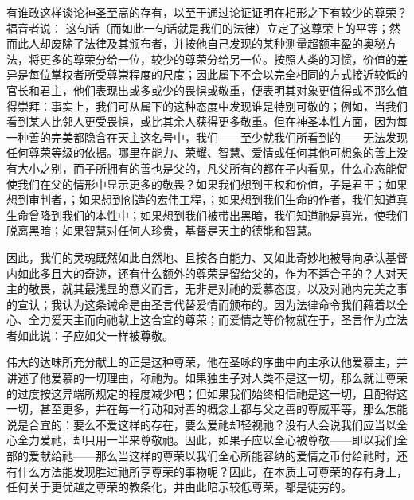 有谁敢这样谈论神圣至高的存有，以至于通过论证证明在相形之下有较少的尊荣？福音者说： 这句话（而如此一句话就是我们的法律）立定了这尊荣上的平等；然而此人却废除了法律及其颁布者，并按他自己发现的某种测量超额丰盈的奥秘方法，将更多的尊荣分给一位，较少的尊荣分给另一位。按照人类的习惯，价值的差异是每位掌权者所受尊崇程度的尺度；因此属下不会以完全相同的方式接近较低的官长和君主，他们表现出或多或少的畏惧或敬重，便表明其对象更值得或不那么值得崇拜：事实上，我们可从属下的这种态度中发现谁是特别可敬的；例如，当我们看到某人比邻人更受畏惧，或比其余人获得更多敬重。但在神圣本性方面，因为每一种善的完美都隐含在天主这名号中，我们——至少就我们所看到的——无法发现任何尊荣等级的依据。哪里在能力、荣耀、智慧、爱情或任何其他可想象的善上没有大小之别，而子所拥有的善也是父的，凡父所有的都在子内看见，什么心态能促使我们在父的情形中显示更多的敬畏？如果我们想到王权和价值，子是君王；如果想到审判者，；如果想到创造的宏伟工程，；如果想到我们生命的作者，我们知道真生命曾降到我们的本性中；如果想到我们被带出黑暗，我们知道祂是真光，使我们脱离黑暗；如果智慧对任何人珍贵，基督是天主的德能和智慧。\par

因此，我们的灵魂既然如此自然地、且按各自能力、又如此奇妙地被导向承认基督内如此多且大的奇迹，还有什么额外的尊荣是留给父的，作为不适合子的？人对天主的敬畏，就其最浅显的意义而言，无非是对祂的爱慕态度，以及对祂内完美之事的宣认；我认为这条诫命是由圣言代替爱情而颁布的。因为法律命令我们藉着以全心、全力爱天主而向祂献上这合宜的尊荣；而爱情之等价物就在于，圣言作为立法者如此说：子应如父一样被尊敬。\par

伟大的达味所充分献上的正是这种尊荣，他在圣咏的序曲中向主承认他爱慕主，并讲述了他爱慕的一切理由，称祂为。如果独生子对人类不是这一切，那么就让尊荣的过度按这异端所规定的程度减少吧；但如果我们始终相信祂是这一切，且配得这一切，甚至更多，并在每一行动和对善的概念上都与父之善的尊威平等，那么怎能说是合宜的：要么不爱这样的存在，要么爱祂却轻视祂？没有人会说我们应当以全心全力爱祂，却只用一半来尊敬祂。因此，如果子应以全心被尊敬——即以我们全部的爱献给祂——那么当这样的尊荣以我们全心所能容纳的爱情之币付给祂时，还有什么方法能发现胜过祂所享尊荣的事物呢？因此，在本质上可尊荣的存有身上，任何关于更优越之尊荣的教条化，并由此暗示较低尊荣，都是徒劳的。\par


